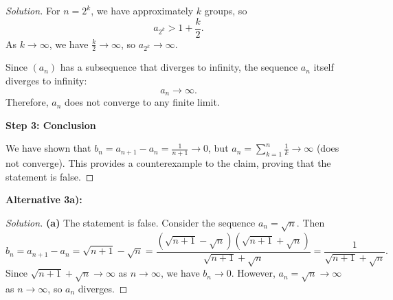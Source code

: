 \documentclass[12pt,a4paper]{article}
\theoremstyle{definition}
\theoremstyle{remark}
\newenvironment{solution}{\begin{proof}[Solution]}{\end{proof}}
\begin{document}
\begin{solution}
For $n = 2^k$, we have approximately $k$ groups, so
\[
a_{2^k} > 1 + \frac{k}{2}.
\]
As $k \to \infty$, we have $\frac{k}{2} \to \infty$, so $a_{2^k} \to \infty$.

Since $(a_n)$ has a subsequence that diverges to infinity, the sequence $a_n$ itself diverges to infinity:
\[
a_n \to \infty.
\]
Therefore, $a_n$ does not converge to any finite limit.

\textbf{Step 3: Conclusion}

We have shown that $b_n = a_{n+1} - a_n = \frac{1}{n+1} \to 0$, but $a_n = \sum_{k=1}^n \frac{1}{k} \to \infty$ (does not converge). This provides a counterexample to the claim, proving that the statement is false.
\end{solution}
\textbf{Alternative 3a):}
\begin{solution}
\textbf{(a)} The statement is false. Consider the sequence $a_n = \sqrt{n}$. Then
\[
b_n = a_{n+1} - a_n = \sqrt{n+1} - \sqrt{n} = \frac{(\sqrt{n+1} - \sqrt{n})(\sqrt{n+1} + \sqrt{n})}{\sqrt{n+1} + \sqrt{n}} = \frac{1}{\sqrt{n+1} + \sqrt{n}}.
\]
Since $\sqrt{n+1} + \sqrt{n} \to \infty$ as $n \to \infty$, we have $b_n \to 0$. However, $a_n = \sqrt{n} \to \infty$ as $n \to \infty$, so $a_n$ diverges.
\end{solution}

\end{document}
